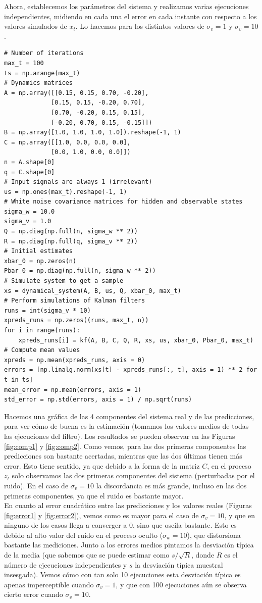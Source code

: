 \documentclass[11pt,a4paper]{article}
\begin{document}
Ahora, establecemos los parámetros del sistema y realizamos varias ejecuciones independientes, midiendo en cada una el error en cada instante con respecto a los valores simulados de $x_t$. Lo hacemos para los distintos valores de $\sigma_v=1$ y $\sigma_v=10$.

\begin{verbatim}
# Number of iterations
max_t = 100
ts = np.arange(max_t)
# Dynamics matrices
A = np.array([[0.15, 0.15, 0.70, -0.20],
             [0.15, 0.15, -0.20, 0.70],
             [0.70, -0.20, 0.15, 0.15],
             [-0.20, 0.70, 0.15, -0.15]])
B = np.array([1.0, 1.0, 1.0, 1.0]).reshape(-1, 1)
C = np.array([[1.0, 0.0, 0.0, 0.0],
             [0.0, 1.0, 0.0, 0.0]])
n = A.shape[0]
q = C.shape[0]
# Input signals are always 1 (irrelevant)
us = np.ones(max_t).reshape(-1, 1)
# White noise covariance matrices for hidden and observable states
sigma_w = 10.0
sigma_v = 1.0
Q = np.diag(np.full(n, sigma_w ** 2))
R = np.diag(np.full(q, sigma_v ** 2))
# Initial estimates
xbar_0 = np.zeros(n)
Pbar_0 = np.diag(np.full(n, sigma_w ** 2))
# Simulate system to get a sample
xs = dynamical_system(A, B, us, Q, xbar_0, max_t)
# Perform simulations of Kalman filters
runs = int(sigma_v * 10)
xpreds_runs = np.zeros((runs, max_t, n))
for i in range(runs):
    xpreds_runs[i] = kf(A, B, C, Q, R, xs, us, xbar_0, Pbar_0, max_t)
# Compute mean values
xpreds = np.mean(xpreds_runs, axis = 0)
errors = [np.linalg.norm(xs[t] - xpreds_runs[:, t], axis = 1) ** 2 for t in ts]
mean_error = np.mean(errors, axis = 1)
std_error = np.std(errors, axis = 1) / np.sqrt(runs)
\end{verbatim}


Hacemos una gráfica de las 4 componentes del sistema real y de las predicciones, para ver cómo de buena es la estimación (tomamos los valores medios de todas las ejecuciones del filtro). Los resultados se pueden observar en las Figuras \ref{fig:comp1} y \ref{fig:comp2}. Como vemos, para las dos primeras componentes las predicciones son bastante acertadas, mientras que las dos últimas tienen más error. Esto tiene sentido, ya que debido a la forma de la matriz $C$, en el proceso $z_t$ solo observamos las dos primeras componentes del sistema (perturbadas por el ruido). En el caso de $\sigma_v=10$ la discordancia es más grande, incluso en las dos primeras componentes, ya que el ruido es bastante mayor.\\

En cuanto al error cuadrático entre las predicciones y los valores reales (Figuras \ref{fig:error1} y \ref{fig:error2}), vemos como es mayor para el caso de $\sigma_v=10$, y que en ninguno de los casos llega a converger a $0$, sino que oscila bastante. Esto es debido al alto valor del ruido en el proceso oculto ($\sigma_w=10$), que distorsiona bastante las mediciones. Junto a los errores medios pintamos la desviación típica de la media (que sabemos que se puede estimar como $s/\sqrt{R}$, donde $R$ es el número de ejecuciones independientes y $s$ la desviación típica muestral insesgada). Vemos cómo con tan solo 10 ejecuciones esta desviación típica es apenas imperceptible cuando $\sigma_v=1$, y que con 100 ejecuciones aún se observa cierto error cuando $\sigma_v=10$.
\newpage
\end{document}
